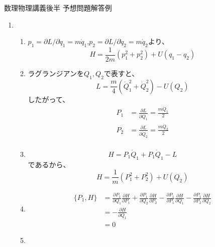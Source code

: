 \documentclass{jsarticle}
\begin{document}
\begin{center}
  {\huge 数理物理講義後半 予想問題解答例}\\
\end{center}

\begin{enumerate}
  \item
        \begin{enumerate}
          \item $p_1 = \partial L/\partial \dot{q}_1 = m\dot{q}_1$,$p_2 = \partial L/\partial \dot{q}_2 = m\dot{q}_2$より、
                $$
                  H = \frac{1}{2m}(p_1^2+p_2^2) + U(q_1-q_2)
                $$
          \item ラグランジアンを$Q_1, Q_2$で表すと、
                $$
                  L = \frac{m}{4}(\dot{Q}_1^2+\dot{Q}_2^2) - U(Q_2)
                $$
                したがって、
                $$
                  \begin{aligned}
                    P_1 & = \frac{\partial L}{\partial \dot{Q}_1} = \frac{m \dot{Q}_1}{2} \\
                    P_2 & = \frac{\partial L}{\partial \dot{Q}_2} = \frac{m \dot{Q}_2}{2} \\
                  \end{aligned}
                $$
          \item
                $$
                  H = P_1 \dot{Q}_1 + P_1 \dot{Q}_1 - L
                $$
                であるから、
                $$
                  H = \frac{1}{m}(P_1^2+P_2^2) + U(Q_2)
                $$
          \item
                $$
                  \begin{aligned}
                    \{P_1, H\} & = \frac{\partial P_1}{\partial Q_1}\frac{\partial H}{\partial P_1}
                    +\frac{\partial P_1}{\partial Q_2}\frac{\partial H}{\partial P_2}
                    - \frac{\partial P_1}{\partial P_1}\frac{\partial H}{\partial Q_1}
                    - \frac{\partial P_1}{\partial P_2}\frac{\partial H}{\partial Q_2}              \\
                               & = - \frac{\partial H}{\partial Q_1}                                \\
                               & = 0
                  \end{aligned}
                $$
          \item
                $$
                  \begin{aligned}

\end{aligned}$$
\end{enumerate}
\end{enumerate}
\end{document}
